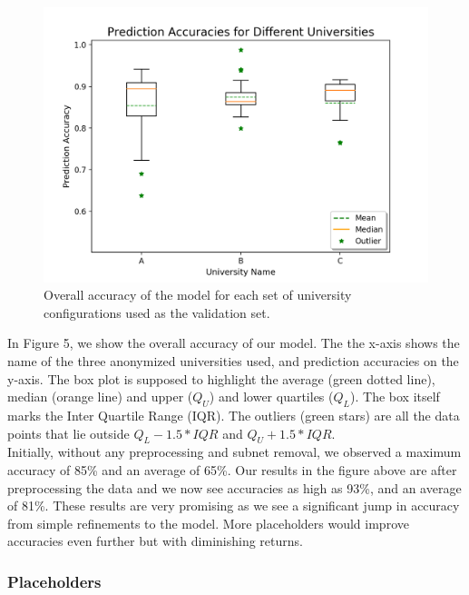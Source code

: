  
\begin{figure}[H]
	\centering
	\includegraphics[width=5in]{uni_analysis.png}
	\caption{Overall accuracy of the model for each set of university configurations used as the validation set.}
\end{figure}

In Figure 5, we show the overall accuracy of our model. The the x-axis shows the name of the three anonymized universities used, and prediction accuracies on the y-axis. The box plot is supposed to highlight the average (green dotted line), median (orange line) and upper ($Q_U$) and lower quartiles ($Q_L$). The box itself marks the Inter Quartile Range (IQR). The outliers (green stars) are all the data points that lie outside $Q_L - 1.5*IQR$ and $Q_U+1.5*IQR$.\\

Initially, without any preprocessing and subnet removal, we observed a maximum accuracy of 85\% and an average of 65\%. Our results in the figure above are after preprocessing the data and we now see accuracies as high as 93\%, and an average of 81\%. These results are very promising as we see a significant jump in accuracy from simple refinements to the model. More placeholders would improve accuracies even further but with diminishing returns.

\subsubsection{Placeholders}

